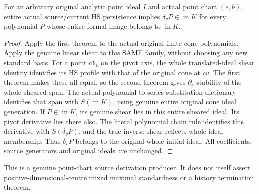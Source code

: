 \begin{theorem}
\label{hir:actual-original-directional-persistence-source-derivation}
\leanok
For an arbitrary original analytic point ideal $I$ and actual point chart
$(e,b)$, entire actual source/current HS persistence implies
$\delta_vP\in\operatorname{in}K$ for every polynomial $P$ whose entire
formal image belongs to $\operatorname{in}K$.
\end{theorem}
\begin{proof}
Apply the first theorem to the actual original finite cone polynomials.
Apply the genuine linear shear to this SAME family, without choosing any
new standard basis. For a point $c\mathbf1_e$ on the pivot axis, the whole
translated-ideal shear identity identifies its HS profile with that of the
original cone at $cv$. The first theorem makes these all equal, so the
second theorem gives $\partial_e$-stability of the whole sheared span.
The actual polynomial-to-series substitution dictionary identifies that
span with $S(\operatorname{in}K)$, using genuine entire original cone
ideal generation. If $P\in\operatorname{in}K$, its genuine shear lies in
this entire sheared ideal. Its pivot derivative lies there also. The
literal polynomial chain rule identifies this derivative with
$S(\delta_vP)$, and the true inverse shear reflects whole ideal membership.
Thus $\delta_vP$ belongs to the original whole initial ideal. All
coefficients, source generators and original ideals are unchanged.
\end{proof}

This is a genuine point-chart source derivation producer. It does not itself
assert positive-dimensional-centre mixed maximal standardness or a history
termination theorem.

